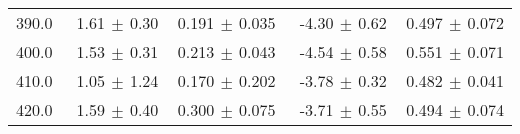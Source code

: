 \begin{table}[htbp]
\begin{center}
\begin{tabular}{|c||r|r||r|r|}
390.0 &  1.61$\,\pm\,$0.30$\;\;\;$ &  0.191$\,\pm\,$0.035$\;\;$ & -4.30$\,\pm\,$0.62$\;\;\;$ &  0.497$\,\pm\,$0.072$\;\;$ \\ 
400.0 &  1.53$\,\pm\,$0.31$\;\;\;$ &  0.213$\,\pm\,$0.043$\;\;$ & -4.54$\,\pm\,$0.58$\;\;\;$ &  0.551$\,\pm\,$0.071$\;\;$ \\ 
410.0 &  1.05$\,\pm\,$1.24$\;\;\;$ &  0.170$\,\pm\,$0.202$\;\;$ & -3.78$\,\pm\,$0.32$\;\;\;$ &  0.482$\,\pm\,$0.041$\;\;$ \\ 
420.0 &  1.59$\,\pm\,$0.40$\;\;\;$ &  0.300$\,\pm\,$0.075$\;\;$ & -3.71$\,\pm\,$0.55$\;\;\;$ &  0.494$\,\pm\,$0.074$\;\;$ \\ 
\hline 
\end{tabular} 

\end{center} 
\end{table} 
